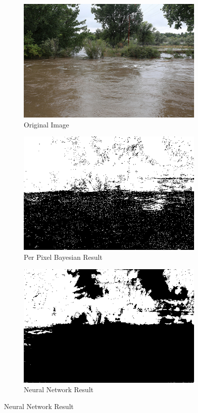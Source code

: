 \documentclass[12pt]{article}
\begin{document}
\begin{figure}
\begin{subfigure}{.33\textwidth}
  \centering
  \includegraphics[width=.9\linewidth]{./images/sourceImages/9735153100_74810bbe65.png}
  \caption{Original Image}
\end{subfigure}%
\begin{subfigure}{.33\textwidth}
  \centering
  \includegraphics[width=.9\linewidth]{./images/perPixelBayesianClassifierPrimaryResults/9735153100_74810bbe65.png}
  \caption{Per Pixel Bayesian Result}
\end{subfigure}%
\begin{subfigure}{.33\textwidth}
  \centering
  \includegraphics[width=.9\linewidth]{./images/NeuralNetworkClassifierpt339602PrimaryResults25NodeLayers/9735153100_74810bbe65.png}
  \caption{Neural Network Result}
\end{subfigure}%


\end{figure}
\end{document}

